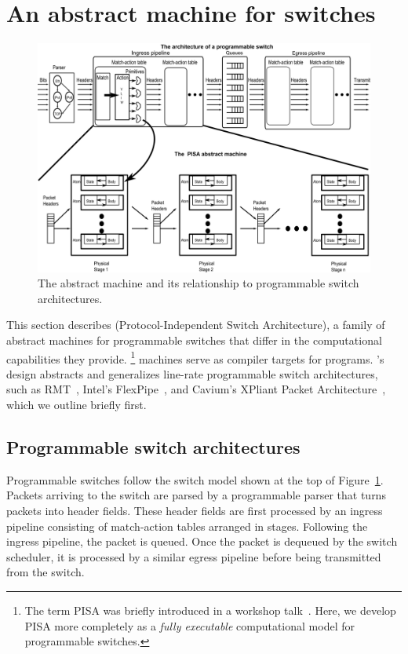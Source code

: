 \section{An abstract machine for switches}
\label{s:absmachine}

\begin{figure}[!t]
  \includegraphics[width=\textwidth]{pisa.pdf}
  \caption{The \absmachine abstract machine and its relationship to
  programmable switch architectures.}
  \label{fig:switch}
\end{figure}

This section describes \absmachine (Protocol-Independent Switch Architecture), a
family of abstract machines for programmable switches that differ in the
computational capabilities they provide.  \footnote{The term PISA was briefly
  introduced in a workshop talk~\cite{nick_p4}.  Here, we develop PISA more
completely as a \textit{fully executable} computational model for programmable
switches.} \absmachine machines serve as compiler targets for \pktlanguage
programs.  \absmachine's design abstracts and generalizes line-rate
programmable switch architectures, such as RMT~\cite{rmt}, Intel's
FlexPipe~\cite{flexpipe}, and Cavium's XPliant Packet
Architecture~\cite{xpliant}, which we outline briefly first.

\subsection{Programmable switch architectures}
Programmable switches follow the switch model shown at the top of
Figure~\ref{fig:switch}.  Packets arriving to the switch are parsed by a
programmable parser that turns packets into header fields. These header fields
are first processed by an ingress pipeline consisting of match-action tables
arranged in stages.  Following the ingress pipeline, the packet is queued. Once
the packet is dequeued by the switch scheduler, it is processed by a similar
egress pipeline before being transmitted from the switch.


